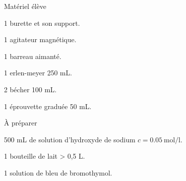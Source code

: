 
\begin{boiteMateriel}{Matériel élève}

  \begin{listePoints}
    \item 1 burette et son support.
    \item 1 agitateur magnétique.
    \item 1 barreau aimanté.
    \item 1 erlen-meyer 250 mL.
    \item 2 bécher 100 mL.
    \item 1 éprouvette graduée 50 mL.
  \end{listePoints}
\end{boiteMateriel}

\begin{boiteMateriel}{À préparer}
  \begin{listePoints}
    \item 500 mL de solution d'hydroxyde de sodium $c = \qty{0,05}{\mol\per\litre}$.
    \item 1 bouteille de lait > 0,5 L.
    \item 1 solution de bleu de bromothymol.
  \end{listePoints}
\end{boiteMateriel}
